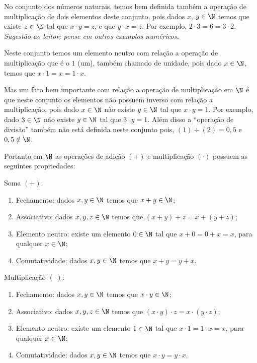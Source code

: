  No conjunto dos números naturais, temos bem definida também a operação de multiplicação de dois elementos deste conjunto, pois dados $x$, $y \in \N$ temos que existe $z \in \N$ tal que $x \cdot y=z$, e que $y \cdot x=z$. Por exemplo, $2 \cdot 3=6=3 \cdot2$. \emph{Sugestão ao leitor: pense em outros exemplos numéricos.}

 Neste conjunto temos um elemento neutro com relação a operação de multiplicação que é o $1$ (um), também chamado de unidade, pois dado $x \in \N$, temos que $x \cdot 1= x= 1 \cdot x$.

 Mas um fato bem importante com relação a operação de multiplicação em $\N$ é que neste conjunto os elementos não possuem inverso com relação a multiplicação, pois dado $x \in \N$ não existe $y \in \N$ tal que $x \cdot y= 1$. Por exemplo, dado $3 \in \N$ não existe $y \in \N$ tal que $3 \cdot y= 1$. Além disso a ``operação de divisão'' também não está definida neste conjunto pois, $(1)\div (2)= 0,5$ e $0,5 \notin \N$.

  \vskip0.3cm

 Portanto em $\N$ as operações de adição $(+)$ e multiplicação $(\cdot)$ possuem as seguintes propriedades:

 Soma $(+)$:
 \begin{enumerate}[1)]
 \item Fechamento: dados $x, y \in \N$ temos que $x+y \in \N$;
 \item Associativo: dados $x, y, z \in \N$ temos que $(x+y)+z= x+(y+z)$;
 \item Elemento neutro: existe um elemento $0 \in \N$ tal que $x+0=0+x=x$, para qualquer $x \in \N$;
 \item Comutatividade: dados $x, y \in \N$ temos que $x+y= y+x$.
 \end{enumerate}

  Multiplicação $(\cdot)$:
 \begin{enumerate}[1)]
 \item Fechamento: dados $x, y \in \N$ temos que $x \cdot y \in \N$;
 \item Associativo: dados $x, y, z \in \N$ temos que $(x \cdot y) \cdot z= x \cdot (y \cdot z)$;
 \item Elemento neutro: existe um elemento $1 \in \N$ tal que $x \cdot 1= 1 \cdot x= x$, para qualquer $x \in \N$;
 \item Comutatividade: dados $x, y \in \N$ temos que $x \cdot y= y \cdot x$.
 \end{enumerate}

